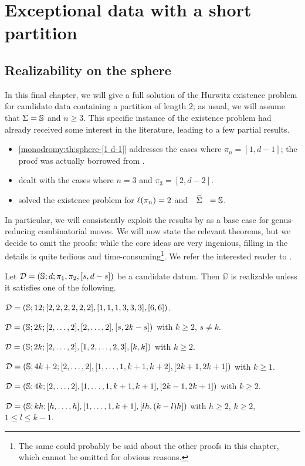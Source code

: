 \chapter{Exceptional data with a short partition}\label{short-partition:ch}
\smallvertices{}

\section{Realizability on the sphere}

In this final chapter, we will give a full solution of the Hurwitz existence problem for candidate data containing a partition of length $2$; as usual, we will assume that $\Sigma=\mathbb{S}{}$ and $n\ge 3$. This specific instance of the existence problem had already received some interest in the literature, leading to a few partial results.
\begin{itemize}
\item \cref{monodromy:th:sphere-[1 d-1]} addresses the cases where $\pi_n=[1,d-1]$; the proof was actually borrowed from .
\item \textcite{pervova-existence-ii} dealt with the cases where $n=3$ and $\pi_3=[2,d-2]$.
\item \textcite{pakovich} solved the existence problem for $\ell(\pi_n)=2$ and $\tSigma=\sphere{}$.
\end{itemize}
In particular, we will consistently exploit the results by \citeauthor{pakovich} as a base case for genus-reducing combinatorial moves. We will now state the relevant theorems, but we decide to omit the proofs: while the core ideas are very ingenious, filling in the details is quite tedious and time-consuming\footnote{The same could probably be said about the other proofs in this chapter, which cannot be omitted for obvious reasons.}. We refer the interested reader to \cite{pakovich}.

\begin{theorem}\label{short-partition:th:realizability-on-sphere-n-3}
Let $\mathcal{D}=(\mathbb{S}{};d;\pi_1,\pi_2,[s,d-s])$ be a candidate datum. Then $\DD$ is realizable unless it satisfies one of the following.
\begin{enumarabic}
\item $\mathcal{D}=(\mathbb{S}{};12;[2,2,2,2,2,2],[1,1,1,3,3,3],[6,6])$.
\item $\mathcal{D}=(\mathbb{S}{};2k;[2,\ldots,2],[2,\ldots,2],[s,2k-s])$ with $k\ge 2$, $s\neq k$.
\item $\mathcal{D}=(\mathbb{S}{};2k;[2,\ldots,2],[1,2,\ldots,2,3],[k,k])$ with $k\ge2$.
\item $\mathcal{D}=(\mathbb{S}{};4k+2;[2,\ldots,2],[1,\ldots,1,k+1,k+2],[2k+1,2k+1])$ with $k\ge 1$.
\item $\mathcal{D}=(\mathbb{S}{};4k;[2,\ldots,2],[1,\ldots,1,k+1,k+1],[2k-1,2k+1])$ with $k\ge2$.
\item\label{short-partition:th:realizability-on-sphere-n-3:it:6} $\mathcal{D}=(\mathbb{S}{};kh;[h,\ldots,h],[1,\ldots,1,k+1],[lh,(k-l)h])$ with $h\ge 2$, $k\ge 2$, $1\le l\le k-1$.
\end{enumarabic}
\end{theorem}

